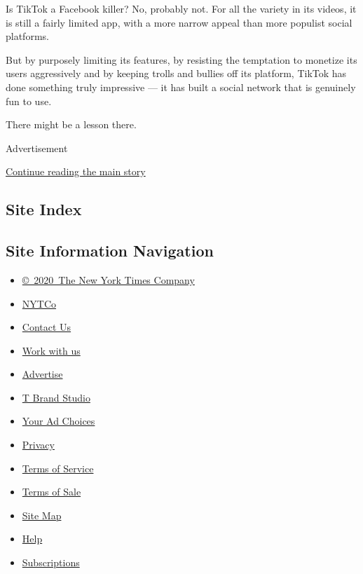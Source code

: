 Is TikTok a Facebook killer? No, probably not. For all the variety in
its videos, it is still a fairly limited app, with a more narrow appeal
than more populist social platforms.

But by purposely limiting its features, by resisting the temptation to
monetize its users aggressively and by keeping trolls and bullies off
its platform, TikTok has done something truly impressive --- it has
built a social network that is genuinely fun to use.

There might be a lesson there.

Advertisement

\protect\hyperlink{after-bottom}{Continue reading the main story}

\hypertarget{site-index}{%
\subsection{Site Index}\label{site-index}}

\hypertarget{site-information-navigation}{%
\subsection{Site Information
Navigation}\label{site-information-navigation}}

\begin{itemize}
\tightlist
\item
  \href{https://help.nytimes.com/hc/en-us/articles/115014792127-Copyright-notice}{©~2020~The
  New York Times Company}
\end{itemize}

\begin{itemize}
\tightlist
\item
  \href{https://www.nytco.com/}{NYTCo}
\item
  \href{https://help.nytimes.com/hc/en-us/articles/115015385887-Contact-Us}{Contact
  Us}
\item
  \href{https://www.nytco.com/careers/}{Work with us}
\item
  \href{https://nytmediakit.com/}{Advertise}
\item
  \href{http://www.tbrandstudio.com/}{T Brand Studio}
\item
  \href{https://www.nytimes.com/privacy/cookie-policy\#how-do-i-manage-trackers}{Your
  Ad Choices}
\item
  \href{https://www.nytimes.com/privacy}{Privacy}
\item
  \href{https://help.nytimes.com/hc/en-us/articles/115014893428-Terms-of-service}{Terms
  of Service}
\item
  \href{https://help.nytimes.com/hc/en-us/articles/115014893968-Terms-of-sale}{Terms
  of Sale}
\item
  \href{https://spiderbites.nytimes.com}{Site Map}
\item
  \href{https://help.nytimes.com/hc/en-us}{Help}
\item
  \href{https://www.nytimes.com/subscription?campaignId=37WXW}{Subscriptions}
\end{itemize}
